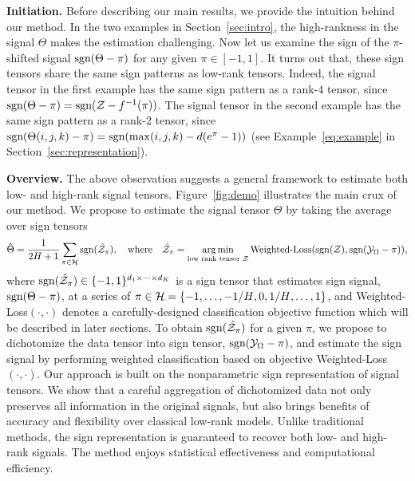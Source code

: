 \documentclass{article}
\theoremstyle{plain}
\theoremstyle{definition}
\def\sign{\textup{sgn}}
\begin{document}
{\bf Initiation.} Before describing our main results, we provide the intuition behind our method. In the two examples in Section~\ref{sec:intro}, the high-rankness in the signal $\Theta$ makes the estimation challenging. Now let us examine the sign of the $\pi$-shifted signal $\sign(\Theta-\pi)$ for any given $\pi\in[-1,1]$. It turns out that, these sign tensors share the same sign patterns as low-rank tensors. Indeed, the signal tensor in the first example has the same sign pattern as a rank-$4$ tensor, since $\sign(\Theta-\pi)=\sign(\tZ-f^{-1}(\pi))$. The signal tensor in the second example has the same sign pattern as a rank-2 tensor, since $\sign(\Theta(i,j,k)-\pi)=\sign(\max(i,j,k)-d(e^{\pi}-1))$ (see Example~\ref{eq:example} in Section~\ref{sec:representation}).


{\bf Overview.} The above observation suggests a general framework to estimate both low- and high-rank signal tensors. Figure~\ref{fig:demo} illustrates the main crux of our method. We propose to estimate the signal tensor $\Theta$ by taking the average over sign tensors
\[
\hat \Theta = {1\over 2H+1}\sum_{\pi \in \tH} \sign(\hat \tZ_\pi), \quad \text{where}\quad \hat \tZ_\pi=\argmin_{\text{low rank tensor $\tZ$}} \text{Weighted-Loss}(\sign(\tZ), \sign (\tY_\Omega-\pi)),
\]
where $\sign(\hat \tZ_\pi)\in\{-1,1\}^{d_1\times\cdots\times d_K}$ is a sign tensor that estimates sign signal, $\sign(\Theta-\pi)$, at a series of $\pi\in \tH={\{\small-1,\ldots,  -{1/H},0, {1/H},\ldots,1\}}$, and Weighted-Loss$(\cdot,\cdot)$ denotes a carefully-designed classification objective function which will be described in later sections. To obtain $\sign(\hat \tZ_\pi)$ for a given $\pi$, we propose to dichotomize the data tensor into sign tensor, $\sign (\tY_\Omega-\pi)$, and estimate the sign signal by performing weighted classification based on objective Weighted-Loss$(\cdot,\cdot)$. 
Our approach is built on the nonparametric sign representation of signal tensors. 
We show that a careful aggregation of dichotomized data not only preserves all information in the original signals, but also brings benefits of accuracy and flexibility over classical low-rank models. Unlike traditional methods, the sign representation is guaranteed to recover both low- and high-rank signals. The method enjoys statistical effectiveness and computational efficiency. 
\end{document}
